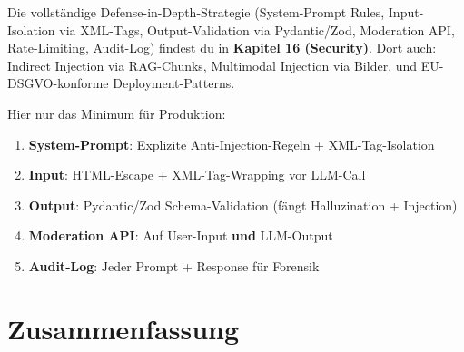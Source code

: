 
Die vollständige Defense-in-Depth-Strategie (System-Prompt Rules, Input-Isolation via XML-Tags, Output-Validation via Pydantic/Zod, Moderation API, Rate-Limiting, Audit-Log) findest du in \textbf{Kapitel 16 (Security)}. Dort auch: Indirect Injection via RAG-Chunks, Multimodal Injection via Bilder, und EU-DSGVO-konforme Deployment-Patterns.

Hier nur das Minimum für Produktion:
\begin{enumerate}
    \item \textbf{System-Prompt}: Explizite Anti-Injection-Regeln + XML-Tag-Isolation
    \item \textbf{Input}: HTML-Escape + XML-Tag-Wrapping vor LLM-Call
    \item \textbf{Output}: Pydantic/Zod Schema-Validation (fängt Halluzination + Injection)
    \item \textbf{Moderation API}: Auf User-Input \textbf{und} LLM-Output
    \item \textbf{Audit-Log}: Jeder Prompt + Response für Forensik
\end{enumerate}


\section{Zusammenfassung}

